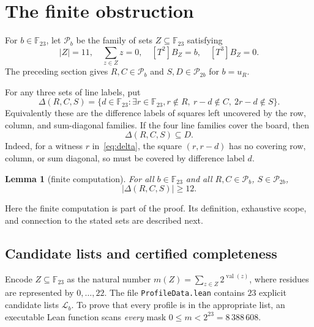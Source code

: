 \documentclass[11pt,a4paper]{article}
\newtheorem{lemma}[theorem]{Lemma}
\theoremstyle{remark}
\newcommand{\F}{\mathbb F_{23}}
\newcommand{\coeff}[2]{[#1]#2}
\newcommand{\card}[1]{\lvert#1\rvert}
\begin{document}
\section{The finite obstruction}\label{sec:finite}
For $b\in\F$, let $\mathcal P_b$ be the family of sets $Z\subseteq\F$ satisfying
\begin{equation}\label{eq:profiles}
 \card Z=11,\quad \sum_{z\in Z}z=0,\quad
 \coeff{T^2}{B_Z}=b,\quad \coeff{T^3}{B_Z}=0.
\end{equation}
The preceding section gives $R,C\in\mathcal P_b$ and
$S,D\in\mathcal P_{2b}$ for $b=u_R$.

For any three sets of line labels, put
\begin{equation}\label{eq:delta}
 \Delta(R,C,S)=\{d\in\F:\exists r\in\F,
       r\notin R,\ r-d\notin C,\ 2r-d\notin S\}.
\end{equation}
Equivalently these are the difference labels of squares left uncovered by the
row, column, and sum-diagonal families. If the four line families cover the
board, then
\begin{equation}\label{eq:subset}
 \Delta(R,C,S)\subseteq D.
\end{equation}
Indeed, for a witness $r$ in~\eqref{eq:delta}, the square $(r,r-d)$ has no
covering row, column, or sum diagonal, so must be covered by difference label $d$.

\begin{lemma}[finite computation]\label{lem:finite}
For all $b\in\F$ and all $R,C\in\mathcal P_b$, $S\in\mathcal P_{2b}$,
\[
 \card{\Delta(R,C,S)}\geq12.
\]
\end{lemma}

Here the finite computation is part of the proof. Its definition, exhaustive
scope, and connection to the stated sets are described next.

\subsection{Candidate lists and certified completeness}
Encode $Z\subseteq\F$ as the natural number
$m(Z)=\sum_{z\in Z}2^{\operatorname{val}(z)}$, where residues are represented
by $0,\ldots,22$. The file \texttt{ProfileData.lean} contains $23$ explicit
candidate lists $\mathcal L_b$.
To prove that every profile is in the appropriate list, an executable Lean
function scans \emph{every} mask $0\leq m<2^{23}=8\,388\,608$.
\end{document}
